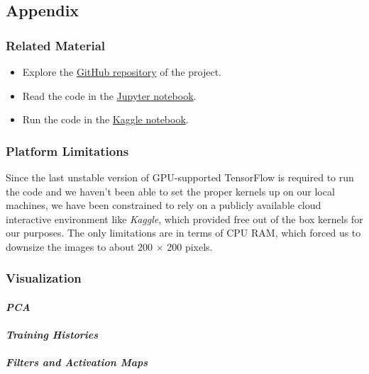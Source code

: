 \documentclass[10pt,]{article}
\providecommand{\tightlist}{%
  \setlength{\itemsep}{0pt}\setlength{\parskip}{0pt}}
\let\oldparagraph\paragraph
\renewcommand{\paragraph}[1]{\oldparagraph{#1}\mbox{}}
\begin{document}
\hypertarget{appendix}{%
\subsection{\texorpdfstring{\textbf{Appendix}}{Appendix}}\label{appendix}}

\hypertarget{additional-material}{%
\subsubsection{Related Material}\label{additional-material}}

\begin{itemize}
\tightlist
\item
  Explore the
  \href{https://github.com/InPhyT/NeuralNetworksProject}{GitHub
  repository} of the project.
\item
  Read the code in the
  \href{https://nbviewer.jupyter.org/github/InPhyT/NeuralNetworksProject/notebook.ipynb}{Jupyter
  notebook}.
\item
  Run the code in the
  \href{https://www.kaggle.com/inphyt2020/neuralnetworksproject}{Kaggle
  notebook}.
\end{itemize}

\hypertarget{platform-limitations}{%
\subsubsection{Platform Limitations}\label{platform-limitations}}

Since the last unstable version of GPU-supported TensorFlow is required
to run the code and we haven't been able to set the proper kernels up on
our local machines, we have been constrained to rely on a publicly
available cloud interactive environment like \emph{Kaggle}, which
provided free out of the box kernels for our purposes. The only
limitations are in terms of CPU RAM, which forced us to downsize the
images to about 200 \(\times\) 200 pixels.

\hypertarget{visualization}{%
\subsubsection{Visualization}\label{visualization}}

\hypertarget{pca}{%
\paragraph{\texorpdfstring{\emph{PCA}}{PCA}}\label{pca}}

\hypertarget{training-histories}{%
\paragraph{\texorpdfstring{\emph{Training
Histories}}{Training Histories}}\label{training-histories}}

\hypertarget{filters-featuremaps}{%
\paragraph{\texorpdfstring{\emph{Filters and Activation
Maps}}{Filters and Activation Maps}}\label{filters-featuremaps}}
\end{document}
